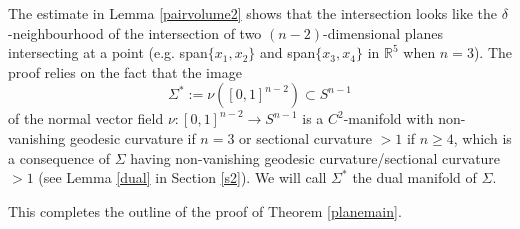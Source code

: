 \documentclass[11pt,a4paper,reqno]{amsart}
\newcommand{\R}{\mathbb{R}}
\newcommand{\1}{\mathbf{1}}
\numberwithin{equation}{section}
\theoremstyle{plain}
\theoremstyle{definition}
\theoremstyle{remark}
\begin{document}
The estimate in Lemma \ref{pairvolume2} shows that the intersection looks like the $\delta$-neighbourhood of the intersection of two $(n-2)$-dimensional planes intersecting at a point (e.g. span$\{x_1,x_2\}$  and span$\{x_3,x_4\}$ in $\R^5$ when $n=3$).
The proof relies on the fact that the image
\begin{equation}\label{szast}
  \Sigma^\ast := \nu([0,1]^{n-2}) \subset S^{n-1}
\end{equation}
of the normal vector field $\nu:[0,1]^{n-2} \to S^{n-1}$
is a $C^2$-manifold with non-vanishing geodesic curvature if $n=3$ or sectional curvature $>1$ if $n \ge 4$, which is a consequence of $\Sigma$ having non-vanishing geodesic curvature/sectional curvature $>1$ (see Lemma \ref{dual} in Section \ref{s2}). We will call $\Sigma^\ast$ the dual manifold of $\Sigma$.

This completes the outline of the proof of Theorem \ref{planemain}.
\end{document}
